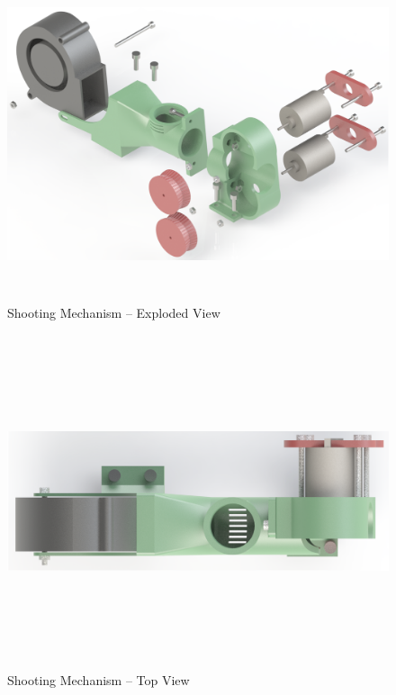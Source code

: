 \begin{figure}[H]   %
	\centering \includegraphics[width=6in, height=3.85in, keepaspectratio]{figures/shooter_explode.png}
	\caption{Shooting Mechanism -- Exploded View}	\label{fig:shooter_explode}
\end{figure}
\begin{figure}[H]   %
	\centering \includegraphics[width=6in, height=3.85in, keepaspectratio]{figures/shooter_top.png}
	\caption{Shooting Mechanism -- Top View}	\label{fig:shooter_top}
\end{figure}
